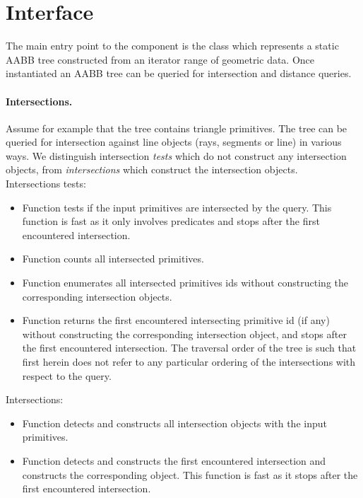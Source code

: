 \section{Interface}
\label{AABB_tree_section_interface}

The main entry point to the component is the class  which represents a static AABB tree constructed from an iterator range of geometric data. Once instantiated an AABB tree can be queried for intersection and distance queries.\\

\paragraph{Intersections.} Assume for example that the tree contains triangle primitives. The tree can be queried for intersection against line objects (rays, segments or line) in various ways. We distinguish intersection \emph{tests} which do not construct any intersection objects, from \emph{intersections} which construct the intersection objects.\\

Intersections tests:
\begin{itemize}
\item Function  tests if the input primitives are intersected by the query. This function is fast as it only involves predicates and stops after the first encountered intersection.
\item Function  counts all intersected primitives.
\item Function  enumerates all intersected primitives ids without constructing the corresponding intersection objects.
\item Function  returns the first encountered intersecting primitive id (if any) without constructing the corresponding intersection object, and stops after the first encountered intersection. The traversal order of the tree is such that first herein does not refer to any particular ordering of the intersections with respect to the query.
\end{itemize}

Intersections:
\begin{itemize}
\item Function  detects and constructs all intersection objects with the input primitives.
\item Function  detects and constructs the first encountered intersection and constructs the corresponding object. This function is fast as it stops after the first encountered intersection.
\end{itemize}

